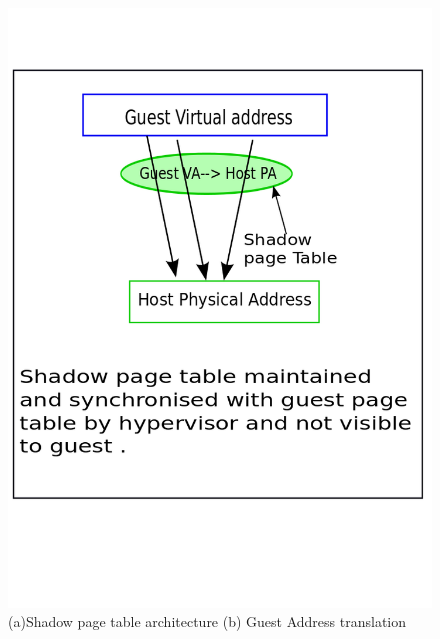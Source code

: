 \documentclass[seminar,twoside]{iitbreport}
\begin{document}
\begin{figure}
\includegraphics[scale =0.2]{page_table.png}
\caption{(a)Shadow page table architecture (b) Guest Address translation }
\end{figure}
\end{document}
